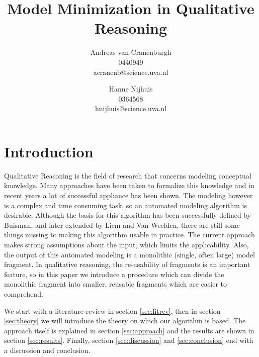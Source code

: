 \documentclass{article} %
\title{Model Minimization in Qualitative Reasoning}
\author{Andreas van Cranenburgh \\ 0440949 \\ acranenb@science.uva.nl 
\and Hanne Nijhuis \\ 0364568 \\ hnijhuis@science.uva.nl}
\begin{document}
\maketitle


\vspace{15em}


\newpage

\tableofcontents

\newpage

\section{Introduction}

Qualitative Reasoning is the field of research that concerns modeling conceptual
knowledge. Many approaches have been taken to formalize this knowledge and in
recent years a lot of successful appliance has been shown. The modeling however
is a complex and time consuming task, so an automated modeling algorithm is
desirable. Although the basis for this algorithm has been successfully defined
by Buisman, and later extended by Liem and Van Weelden, there are still some
things missing to making this algorithm usable in practice. The current
approach makes strong assumptions about the input, which limits the
applicability. Also, the output of this automated modeling is a monolithic
(single, often large) model fragment. In qualitative reasoning, the re-usability
of fragments is an important feature, so in this paper we introduce a
procedure which can divide the monolithic fragment into smaller, reusable
fragments which are easier to comprehend.

We start with a literature review in section \ref{sec:litrev},
then in section \ref{sec:theory} we will introduce the theory on which our
algorithm is based. The approach itself is explained in section
\ref{sec:approach} and the results are shown in section \ref{sec:results}.
Finally, section \ref{sec:discussion} and \ref{sec:conclusion} end with a
discussion and conclusion.
\end{document}
